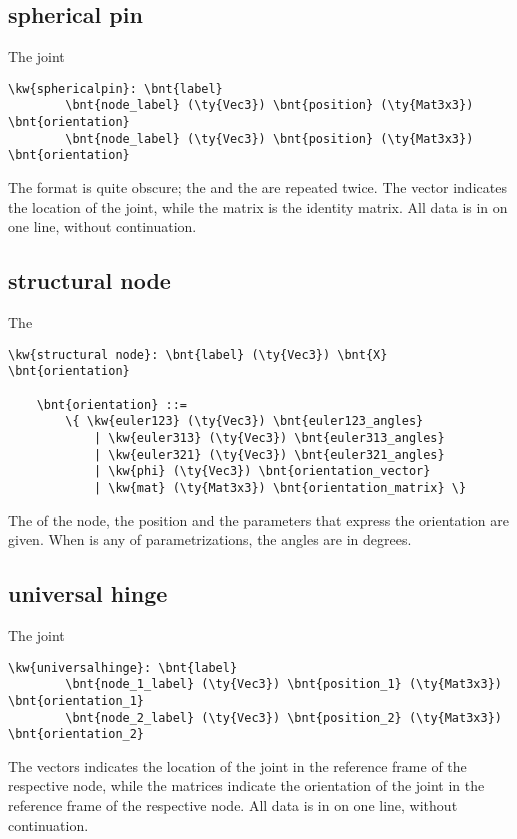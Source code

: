 \subsection{spherical pin}
The  joint
\begin{Verbatim}[commandchars=\\\{\}]
    \kw{sphericalpin}: \bnt{label}
        \bnt{node_label} (\ty{Vec3}) \bnt{position} (\ty{Mat3x3}) \bnt{orientation}
        \bnt{node_label} (\ty{Vec3}) \bnt{position} (\ty{Mat3x3}) \bnt{orientation}
\end{Verbatim}
The format is quite obscure; the  and the 
are repeated twice.
The vector  indicates the location of the joint,
while the matrix  is the identity matrix.
All data is in on one line, without continuation.

\subsection{structural node}
The 
\begin{Verbatim}[commandchars=\\\{\}]
    \kw{structural node}: \bnt{label} (\ty{Vec3}) \bnt{X} \bnt{orientation}

    \bnt{orientation} ::=
        \{ \kw{euler123} (\ty{Vec3}) \bnt{euler123_angles}
            | \kw{euler313} (\ty{Vec3}) \bnt{euler313_angles}
            | \kw{euler321} (\ty{Vec3}) \bnt{euler321_angles}
            | \kw{phi} (\ty{Vec3}) \bnt{orientation_vector}
            | \kw{mat} (\ty{Mat3x3}) \bnt{orientation_matrix} \}
\end{Verbatim}
The  of the node, the position 
and the  parameters that express the orientation
are given.
When  is any of  parametrizations,
the angles are in degrees.

\subsection{universal hinge}
The  joint
\begin{Verbatim}[commandchars=\\\{\}]
    \kw{universalhinge}: \bnt{label}
        \bnt{node_1_label} (\ty{Vec3}) \bnt{position_1} (\ty{Mat3x3}) \bnt{orientation_1}
        \bnt{node_2_label} (\ty{Vec3}) \bnt{position_2} (\ty{Mat3x3}) \bnt{orientation_2}
\end{Verbatim}
The  vectors indicates the location of the joint
in the reference frame of the respective node,
while the  matrices indicate the orientation of the joint
in the reference frame of the respective node.
All data is in on one line, without continuation.

